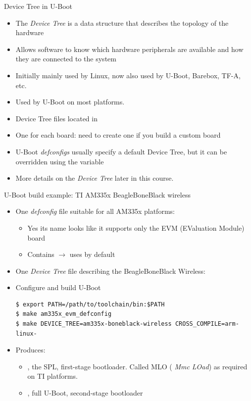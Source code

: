 \begin{frame}{Device Tree in U-Boot}
  \begin{itemize}
  \item The {\em Device Tree} is a data structure that describes the
    topology of the hardware
  \item Allows software to know which hardware peripherals are
    available and how they are connected to the system
  \item Initially mainly used by Linux, now also used by U-Boot,
    Barebox, TF-A, etc.
  \item Used by U-Boot on most platforms.
  \item Device Tree files located in 
  \item One  for each board: need to create one if you
    build a custom board
  \item U-Boot {\em defconfigs} usually specify a default Device Tree,
    but it can be overridden using the  variable
  \item More details on the {\em Device Tree} later in this course.
  \end{itemize}
\end{frame}

\begin{frame}[fragile]{U-Boot build example: TI AM335x BeagleBoneBlack wireless}
  \begin{itemize}
  \item One {\em defconfig} file suitable for all AM335x platforms:
    \begin{itemize}
    \item Yes its name looks like it supports only the EVM (EValuation
      Module) board
    \item Contains 
      $\rightarrow$ uses
       by default
    \end{itemize}
  \item One {\em Device Tree} file describing the BeagleBoneBlack
    Wireless:
  \item Configure and build U-Boot
\begin{verbatim}
$ export PATH=/path/to/toolchain/bin:$PATH
$ make am335x_evm_defconfig
$ make DEVICE_TREE=am335x-boneblack-wireless CROSS_COMPILE=arm-linux-
\end{verbatim}
  \item Produces:
    \begin{itemize}
    \item {}, the SPL, first-stage bootloader. Called MLO ({\em
    Mmc LOad}) as required on TI platforms.
    \item {}, full U-Boot, second-stage bootloader
    \end{itemize}
  \end{itemize}
\end{frame}

